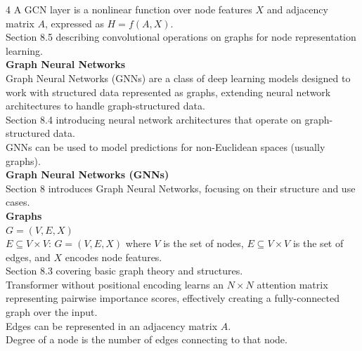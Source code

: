\documentclass[8pt]{extarticle}
\begin{document}
\begin{multicols}{4}
A GCN layer is a nonlinear function over node features $X$ and adjacency matrix $A$, expressed as $H = f(A, X)$.\\
Section 8.5 describing convolutional operations on graphs for node representation learning.\\
\vspace{2pt}\textbf{Graph Neural Networks}\\
Graph Neural Networks (GNNs) are a class of deep learning models designed to work with structured data represented as graphs, extending neural network architectures to handle graph-structured data.\\
Section 8.4 introducing neural network architectures that operate on graph-structured data.\\
GNNs can be used to model predictions for non-Euclidean spaces (usually graphs).\\
\vspace{2pt}\textbf{Graph Neural Networks (GNNs)}\\
Section 8 introduces Graph Neural Networks, focusing on their structure and use cases.\\
\vspace{2pt}\textbf{Graphs}\\
$ G = (V, E, X) $\\
$ E \subseteq V \times V $\Graph: $ G = (V, E, X) $ where $V$ is the set of nodes, $E \subseteq V \times V$ is the set of edges, and $X$ encodes node features.\\
Section 8.3 covering basic graph theory and structures.\\
Transformer without positional encoding learns an $N \times N$ attention matrix representing pairwise importance scores, effectively creating a fully-connected graph over the input.\\
Edges can be represented in an adjacency matrix $A$.\\
Degree of a node is the number of edges connecting to that node.\\


\end{multicols}
\end{document}
